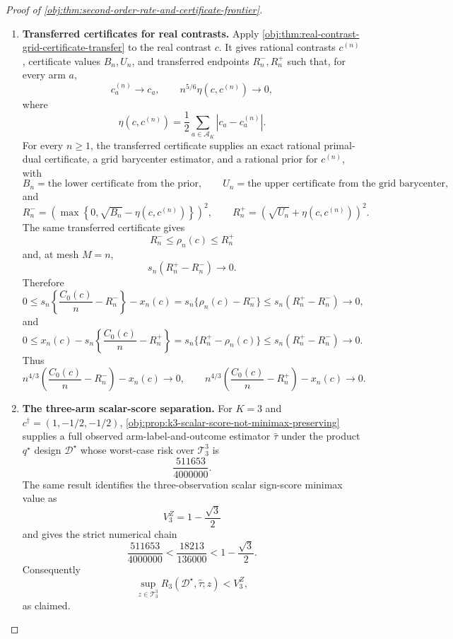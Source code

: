 \begin{proof}[Proof of \cref{obj:thm:second-order-rate-and-certificate-frontier}]
\begin{enumerate}
\item \textbf{Transferred certificates for real contrasts.}
Apply \cref{obj:thm:real-contrast-grid-certificate-transfer} to the real contrast \(c\). It gives rational contrasts \(c^{(n)}\), certificate values \(B_n,U_n\), and transferred endpoints \(R_n^-,R_n^+\) such that, for every arm \(a\),
\[
c_a^{(n)}\to c_a,
\qquad
n^{5/6}\eta(c,c^{(n)})\to0,
\]
where
\[
\eta(c,c^{(n)})
=
\frac12\sum_{a\in\mathcal A_K}|c_a-c_a^{(n)}|.
\]
For every \(n\ge1\), the transferred certificate supplies an exact rational primal-dual certificate, a grid barycenter estimator, and a rational prior for \(c^{(n)}\), with
\[
B_n=\text{the lower certificate from the prior},
\qquad
U_n=\text{the upper certificate from the grid barycenter},
\]
and
\[
R_n^-=
\left(\max\left\{0,\sqrt{B_n}-\eta(c,c^{(n)})\right\}\right)^2,
\qquad
R_n^+=
\left(\sqrt{U_n}+\eta(c,c^{(n)})\right)^2.
\]
The same transferred certificate gives
\[
R_n^-\le \rho_n(c)\le R_n^+
\]
and, at mesh \(M=n\),
\[
s_n(R_n^+-R_n^-)\to0.
\]
Therefore
\[
0
\le
s_n\left\{\frac{C_0(c)}{n}-R_n^-\right\}-x_n(c)
=
s_n\{\rho_n(c)-R_n^-\}
\le
s_n(R_n^+-R_n^-)\to0,
\]
and
\[
0
\le
x_n(c)-s_n\left\{\frac{C_0(c)}{n}-R_n^+\right\}
=
s_n\{R_n^+-\rho_n(c)\}
\le
s_n(R_n^+-R_n^-)\to0.
\]
Thus
\[
n^{4/3}\left(\frac{C_0(c)}{n}-R_n^-\right)-x_n(c)\to0,
\qquad
n^{4/3}\left(\frac{C_0(c)}{n}-R_n^+\right)-x_n(c)\to0.
\] %

\item \textbf{The three-arm scalar-score separation.}
For \(K=3\) and \(c^\dagger=(1,-1/2,-1/2)\), \cref{obj:prop:k3-scalar-score-not-minimax-preserving} supplies a full observed arm-label-and-outcome estimator \(\widehat\tau\) under the product \(q^\star\) design \(\mathcal D^\star\) whose worst-case risk over \(\mathcal T_3^3\) is
\[
\frac{511653}{4000000}.
\]
The same result identifies the three-observation scalar sign-score minimax value as
\[
V_3^Z=1-\frac{\sqrt3}{2}
\]
and gives the strict numerical chain
\[
\frac{511653}{4000000}
<
\frac{18213}{136000}
<
1-\frac{\sqrt3}{2}.
\]
Consequently
\[
\sup_{z\in\mathcal T_3^3}
R_3(\mathcal D^\star,\widehat\tau;z)
<
V_3^Z,
\]
as claimed. %
\end{enumerate}
\end{proof}

